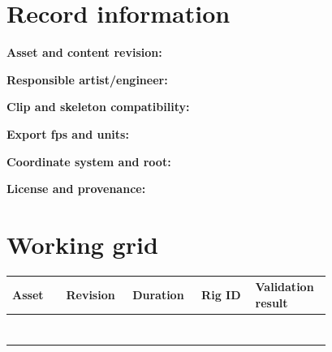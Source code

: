 \documentclass[10pt,letterpaper]{article}
\begin{document}
\makedoctitle
\makedocsummary

\section{Record information}
\noindent\textbf{Asset and content revision:}\quad\hrulefill\par\vspace{10pt}
\noindent\textbf{Responsible artist/engineer:}\quad\hrulefill\par\vspace{10pt}
\noindent\textbf{Clip and skeleton compatibility:}\quad\hrulefill\par\vspace{10pt}
\noindent\textbf{Export fps and units:}\quad\hrulefill\par\vspace{10pt}
\noindent\textbf{Coordinate system and root:}\quad\hrulefill\par\vspace{10pt}
\noindent\textbf{License and provenance:}\quad\hrulefill\par\vspace{10pt}\section{Working grid}
\begin{longtable}{|p{0.156\linewidth}|p{0.156\linewidth}|p{0.156\linewidth}|p{0.156\linewidth}|p{0.156\linewidth}|}
\hline
\textbf{Asset} & \textbf{Revision} & \textbf{Duration} & \textbf{Rig ID} & \textbf{Validation result}\\\hline
\endhead
\rule{0pt}{20pt} &  &  &  & \\\hline
\rule{0pt}{20pt} &  &  &  & \\\hline
\rule{0pt}{20pt} &  &  &  & \\\hline
\rule{0pt}{20pt} &  &  &  & \\\hline
\rule{0pt}{20pt} &  &  &  & \\\hline
\rule{0pt}{20pt} &  &  &  & \\\hline
\rule{0pt}{20pt} &  &  &  & \\\hline
\end{longtable}
\end{document}
